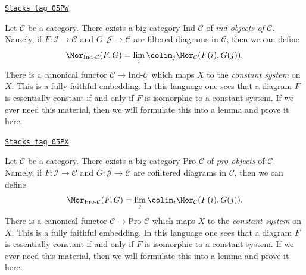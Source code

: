 \begin{remark}
\label{categories-remark-ind-category}
\href{https://stacks.math.columbia.edu/tag/05PW}{\texttt{Stacks tag 05PW}}

Let $\mathcal{C}$ be a category. There exists a big category
$\text{Ind-}\mathcal{C}$ of {\it ind-objects of} $\mathcal{C}$.
Namely, if $F : \mathcal{I} \to \mathcal{C}$ and
$G : \mathcal{J} \to \mathcal{C}$ are filtered diagrams in $\mathcal{C}$,
then we can define
$$
\Mor_{\text{Ind-}\mathcal{C}}(F, G) =
\lim_i \colim_j \Mor_\mathcal{C}(F(i), G(j)).
$$
There is a canonical functor $\mathcal{C} \to \text{Ind-}\mathcal{C}$
which maps $X$ to the {\it constant system} on $X$. This is a fully
faithful embedding. In this language one sees that a diagram $F$ is
essentially constant if and only if $F$ is isomorphic to a constant system.
If we ever need this material, then we will formulate this into a lemma
and prove it here.
\end{remark}

\begin{remark}
\label{categories-remark-pro-category}
\href{https://stacks.math.columbia.edu/tag/05PX}{\texttt{Stacks tag 05PX}}

Let $\mathcal{C}$ be a category. There exists a big category
$\text{Pro-}\mathcal{C}$ of {\it pro-objects} of $\mathcal{C}$.
Namely, if $F : \mathcal{I} \to \mathcal{C}$ and
$G : \mathcal{J} \to \mathcal{C}$ are cofiltered diagrams in $\mathcal{C}$,
then we can define
$$
\Mor_{\text{Pro-}\mathcal{C}}(F, G) =
\lim_j \colim_i \Mor_\mathcal{C}(F(i), G(j)).
$$
There is a canonical functor $\mathcal{C} \to \text{Pro-}\mathcal{C}$
which maps $X$ to the {\it constant system} on $X$. This is a fully
faithful embedding. In this language one sees that a diagram $F$ is
essentially constant if and only if $F$ is isomorphic to a constant system.
If we ever need this material, then we will formulate this into a lemma
and prove it here.
\end{remark}

